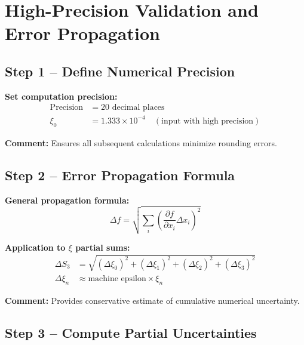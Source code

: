 \documentclass[12pt,a4paper]{article}
\begin{document}
\section{High-Precision Validation and Error Propagation}

\subsection{Step 1 – Define Numerical Precision}

\textbf{Set computation precision:}
\begin{align}
	\text{Precision} &= 20 \text{ decimal places} \\
	\xi_0 &= 1.333 \times 10^{-4} \quad (\text{input with high precision})
\end{align}

\textbf{Comment:} Ensures all subsequent calculations minimize rounding errors.

\subsection{Step 2 – Error Propagation Formula}

\textbf{General propagation formula:}
\begin{equation}
	\Delta f = \sqrt{\sum_i \left( \frac{\partial f}{\partial x_i} \Delta x_i \right)^2 }
\end{equation}

\textbf{Application to $\xi$ partial sums:}
\begin{align}
	\Delta S_3 &= \sqrt{(\Delta \xi_0)^2 + (\Delta \xi_1)^2 + (\Delta \xi_2)^2 + (\Delta \xi_3)^2} \\
	\Delta \xi_n &\approx \text{machine epsilon} \times \xi_n
\end{align}

\textbf{Comment:} Provides conservative estimate of cumulative numerical uncertainty.

\subsection{Step 3 – Compute Partial Uncertainties}
\end{document}
